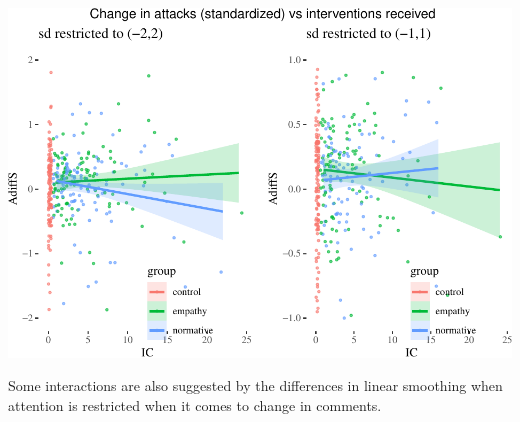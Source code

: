\documentclass[10pt,dvipsnames,enabledeprecatedfontcommands]{scrartcl}
\begin{document}
\begin{center}\includegraphics[width=1\linewidth]{bayesianReport_files/figure-latex/ic-1} \end{center}
\normalsize

Some interactions are also suggested by the differences in linear
smoothing when attention is restricted when it comes to change in
comments.

\vspace{1mm}
\footnotesize
\end{document}
